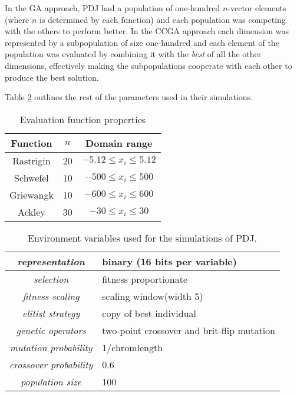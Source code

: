 \documentclass[12pt,a4paper,onecolumn]{article}
\begin{document}
In the GA approach, PDJ had a population of one-hundred $n$-vector elements (where $n$ is determined by each function) and each population was competing with the others to perform better. In the CCGA approach each dimension was represented by a subpopulation of size one-hundred and each element of the population was evaluated by combining it with the \emph{best} of all the other dimensions, effectively making the subpopulations cooperate with each other to produce the best solution.

Table \ref{env_params} outlines the rest of the parameters used in their simulations.


\begin{table}
\begin{center}
\begin{tabular}{ c | c | c }
Function & $n$ & Domain range \\
\hline
\hline
Rastrigin & 20 & $-5.12 \leq x_i \leq 5.12 $\\
Schwefel & 10 & $-500 \leq x_i \leq 500 $\\
Griewangk & 10 & $-600 \leq x_i \leq 600 $\\
Ackley & 30 & $-30 \leq x_i \leq 30 $\\
\end{tabular}
\caption{Evaluation function properties}
\label{func_spec}
\end{center}
\end{table}

\begin{table}
\begin{center}
\begin{tabular}{c  p{4.5cm}}
\hline
\emph{representation} & binary (16 bits per variable)\\ \hline
\emph{selection} & fitness proportionate \\ \hline
\emph{fitness scaling} & scaling window(width 5)\\ \hline
\emph{elitist strategy} & copy of best individual\\ \hline
\emph{genetic operators} & two-point crossover	 and brit-flip mutation \\ \hline
\emph{mutation probability} & 1/chromlength \\ \hline
\emph{crossover probability} & 0.6 \\ \hline
\emph{population size} & 100\\\hline
\end{tabular}
\caption{Environment variables used for the simulations of PDJ.}
\label{env_params}
\end{center}
\end{table}
\end{document}

